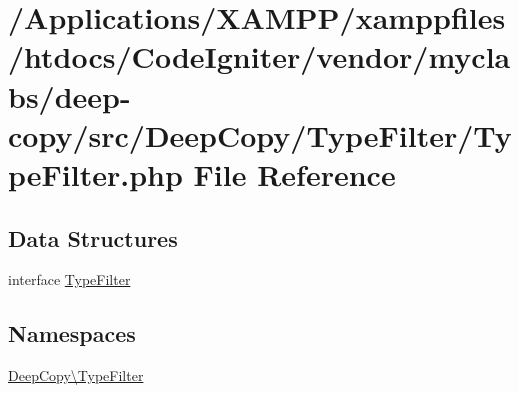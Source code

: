 \hypertarget{_type_filter_8php}{}\section{/\+Applications/\+X\+A\+M\+P\+P/xamppfiles/htdocs/\+Code\+Igniter/vendor/myclabs/deep-\/copy/src/\+Deep\+Copy/\+Type\+Filter/\+Type\+Filter.php File Reference}
\label{_type_filter_8php}
\subsection*{Data Structures}
\begin{DoxyCompactItemize}
\item 
interface \mbox{\hyperlink{interface_deep_copy_1_1_type_filter_1_1_type_filter}{Type\+Filter}}
\end{DoxyCompactItemize}
\subsection*{Namespaces}
\begin{DoxyCompactItemize}
\item 
 \mbox{\hyperlink{namespace_deep_copy_1_1_type_filter}{Deep\+Copy\textbackslash{}\+Type\+Filter}}
\end{DoxyCompactItemize}
